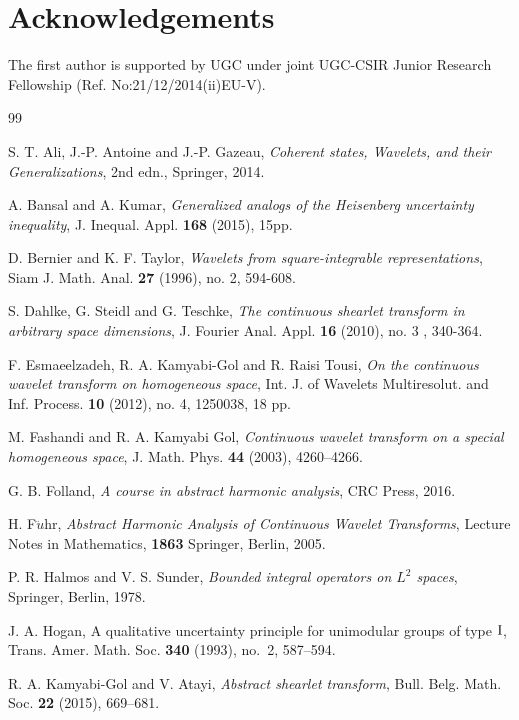 \documentclass[11pt,reqno]{amsart}
\numberwithin{equation}{section}
\theoremstyle{definition}
\begin{document}
\section*{Acknowledgements}
\noindent 
The first author is supported by  UGC under joint UGC-CSIR  Junior Research Fellowship (Ref. No:21/12/2014(ii)EU-V).


\begin{thebibliography}{99}

 S. T. Ali, J.-P. Antoine and J.-P. Gazeau, \textit{Coherent states, Wavelets, and their Generalizations}, 2nd edn., Springer, 2014.  

 A. Bansal and A. Kumar, \textit{Generalized analogs of the Heisenberg uncertainty inequality}, J. Inequal. Appl. \textbf{168} (2015), 15pp. 

 D. Bernier and K. F. Taylor, \textit{Wavelets from square-integrable representations}, Siam J. Math. Anal. \textbf{27} (1996), no. 2, 594-608. 


 S. Dahlke, G. Steidl and  G. Teschke, \textit{The continuous shearlet transform in arbitrary space dimensions}, J. Fourier Anal. Appl. \textbf{16} (2010), no. 3 , 340-364.




 F. Esmaeelzadeh, R. A. Kamyabi-Gol and R. Raisi Tousi, \textit{On the continuous wavelet transform on homogeneous space}, Int. J. of Wavelets Multiresolut. and Inf. Process. \textbf{10} (2012), no. 4,  1250038, 18 pp. 

 M. Fashandi and R. A. Kamyabi Gol, \textit{Continuous wavelet transform on a special homogeneous space}, J. Math. Phys. \textbf{44} (2003), 4260--4266.

 G. B. Folland, \textit{A course in abstract harmonic analysis}, CRC Press, 2016.

 H. F$\ddot{u}$hr, \textit{Abstract Harmonic Analysis of Continuous Wavelet Transforms}, Lecture Notes in Mathematics, \textbf{1863} Springer, Berlin, 2005. 

  P. R. Halmos and V. S. Sunder, \textit{Bounded integral operators on $L^2$ spaces}, Springer, Berlin, 1978.

 J. A. Hogan, A qualitative uncertainty principle for unimodular groups of type ${\rm I}$, Trans. Amer. Math. Soc. {\bf 340} (1993), no.~2, 587--594. 


 R. A. Kamyabi-Gol and V. Atayi, \textit{Abstract shearlet transform}, Bull. Belg. Math. Soc. \textbf{22} (2015), 669--681.


\end{thebibliography}
\end{document}
